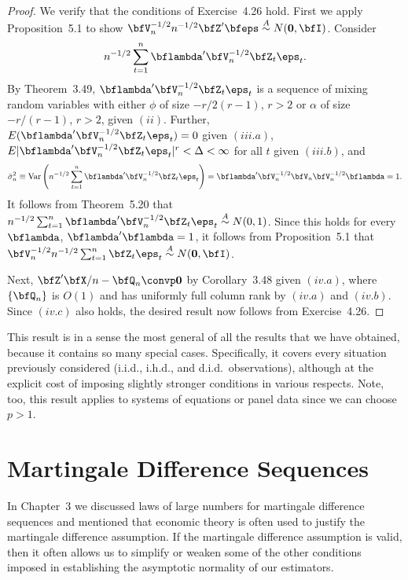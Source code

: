\begin{proof}
We verify that the conditions of Exercise~4.26 hold. First we apply Proposition~5.1 to show $\bfV_n^{-1/2}n^{-1/2}\bfZ'\bfeps \overset{A}{\sim} N(\mathbf{0}, \bfI)$. Consider
\[
n^{-1/2}\sum_{t=1}^{n}\bflambda'\bfV_n^{-1/2}\bfZ_t\eps_t.
\]
By Theorem~3.49, $\bflambda'\bfV_n^{-1/2}\bfZ_t\eps_t$ is a sequence of mixing random variables with either $\phi$ of size $-r/2(r-1)$, $r > 2$ or $\alpha$ of size $-r/(r-1)$, $r > 2$, given $(ii)$. Further, $E(\bflambda'\bfV_n^{-1/2}\bfZ_t\eps_t) = 0$ given $(iii.a)$, $E|\bflambda'\bfV_n^{-1/2}\bfZ_t\eps_t|^r < \Delta < \infty$ for all $t$ given $(iii.b)$, and
\[
\bar{\sigma}_n^2 \equiv \Var\left(n^{-1/2}\sum_{t=1}^{n}\bflambda'\bfV_n^{-1/2}\bfZ_t\eps_t\right) = \bflambda'\bfV_n^{-1/2}\bfV_n\bfV_n^{-1/2}\bflambda = 1.
\]
It follows from Theorem~5.20 that $n^{-1/2}\sum_{t=1}^{n}\bflambda'\bfV_n^{-1/2}\bfZ_t\eps_t \overset{A}{\sim} N(0,1)$. Since this holds for every $\bflambda$, $\bflambda'\bflambda = 1$, it follows from Proposition~5.1 that $\bfV_n^{-1/2}n^{-1/2}\sum_{t=1}^{n}\bfZ_t\eps_t \overset{A}{\sim} N(\mathbf{0}, \bfI)$.

Next, $\bfZ'\bfX/n - \bfQ_n \convp \mathbf{0}$ by Corollary~3.48 given $(iv.a)$, where $\{\bfQ_n\}$ is $O(1)$ and has uniformly full column rank by $(iv.a)$ and $(iv.b)$. Since $(iv.c)$ also holds, the desired result now follows from Exercise~4.26.
\end{proof}

This result is in a sense the most general of all the results that we have obtained, because it contains so many special cases. Specifically, it covers every situation previously considered (i.i.d., i.h.d., and d.i.d.\ observations), although at the explicit cost of imposing slightly stronger conditions in various respects. Note, too, this result applies to systems of equations or panel data since we can choose $p > 1$.

\section{Martingale Difference Sequences}\label{sec:clt-mds}

In Chapter~3 we discussed laws of large numbers for martingale difference sequences and mentioned that economic theory is often used to justify the martingale difference assumption. If the martingale difference assumption is valid, then it often allows us to simplify or weaken some of the other conditions imposed in establishing the asymptotic normality of our estimators.

